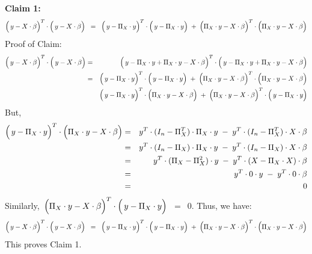 \vskip 0.5cm
\noindent
\textbf{Claim 1:}
\begin{equation*}
\left(\,y \overset{{\color{white}.}}{-} X\cdot\beta\right)^{T}\cdot\left(\,y \overset{{\color{white}.}}{-} X\cdot\beta\right)
\;\; = \;\;
	\left(\,y \overset{{\color{white}.}}{-} \Pi_{X} \cdot y\right)^{T}\cdot\left(\,y \overset{{\color{white}.}}{-} \Pi_{X} \cdot y\right)
	\;+\;
	\left(\Pi_{X} \cdot y \overset{{\color{white}.}}{-} X\cdot\beta\right)^{T}\cdot\left(\Pi_{X} \cdot y \overset{{\color{white}.}}{-} X\cdot\beta\right)
\end{equation*}
Proof of Claim:
\begin{eqnarray*}
\left(\,y \overset{{\color{white}.}}{-} X\cdot\beta\right)^{T}\cdot\left(\,y \overset{{\color{white}.}}{-} X\cdot\beta\right)
&=&
	\left(\,y \overset{{\color{white}.}}{-} \Pi_{X} \cdot y + \Pi_{X} \cdot y - X\cdot\beta\right)^{T}
	\cdot
	\left(\,y \overset{{\color{white}.}}{-} \Pi_{X} \cdot y + \Pi_{X} \cdot y - X\cdot\beta\right)
\\
&=&
	\left(\,y \overset{{\color{white}.}}{-} \Pi_{X} \cdot y\right)^{T}\cdot\left(\,y \overset{{\color{white}.}}{-} \Pi_{X} \cdot y\right)
	\;+\;
	\left(\Pi_{X} \cdot y \overset{{\color{white}.}}{-} X\cdot\beta\right)^{T}\cdot\left(\Pi_{X} \cdot y \overset{{\color{white}.}}{-} X\cdot\beta\right)
\\
&&
	\left(\,y \overset{{\color{white}.}}{-} \Pi_{X} \cdot y\right)^{T}
	\cdot
	\left(\Pi_{X} \cdot y \overset{{\color{white}.}}{-} X\cdot\beta\right)
	\;+\;
	\left(\Pi_{X} \cdot y \overset{{\color{white}.}}{-} X\cdot\beta\right)^{T}
	\cdot
	\left(\,y \overset{{\color{white}.}}{-} \Pi_{X} \cdot y\right)
\end{eqnarray*}
But,
\begin{eqnarray*}
\left(\,y \overset{{\color{white}.}}{-} \Pi_{X} \cdot y\right)^{T}
\cdot
\left(\Pi_{X} \cdot y \overset{{\color{white}.}}{-} X\cdot\beta\right)
&=&
	y^{T} \cdot (I_{n} - \Pi_{X}^{T}) \cdot \Pi_{X} \cdot y
	\;-\;
	y^{T} \cdot (I_{n} - \Pi_{X}^{T}) \cdot X\cdot\beta
\\
&=&
	y^{T} \cdot (I_{n} - \Pi_{X}) \cdot \Pi_{X} \cdot y
	\;-\;
	y^{T} \cdot (I_{n} - \Pi_{X}) \cdot X\cdot\beta
\\
&=&
	y^{T} \cdot (\Pi_{X} - \Pi_{X}^{2}) \cdot y
	\;-\;
	y^{T} \cdot (X - \Pi_{X} \cdot X) \cdot\beta
\\
&=&
	y^{T} \cdot 0 \cdot y \;-\; y^{T} \cdot 0 \cdot \beta
\\
&=&
	0
\end{eqnarray*}
Similarly,
\,$\left(\Pi_{X} \cdot y \overset{{\color{white}.}}{-} X\cdot\beta\right)^{T} \cdot \left(\,y \overset{{\color{white}.}}{-} \Pi_{X} \cdot y\right)$
\,$=$\, $0$.
Thus, we have:
\begin{equation*}
\left(\,y \overset{{\color{white}.}}{-} X\cdot\beta\right)^{T}\cdot\left(\,y \overset{{\color{white}.}}{-} X\cdot\beta\right)
\;\; = \;\;
	\left(\,y \overset{{\color{white}.}}{-} \Pi_{X} \cdot y\right)^{T}\cdot\left(\,y \overset{{\color{white}.}}{-} \Pi_{X} \cdot y\right)
	\;+\;
	\left(\Pi_{X} \cdot y \overset{{\color{white}.}}{-} X\cdot\beta\right)^{T}\cdot\left(\Pi_{X} \cdot y \overset{{\color{white}.}}{-} X\cdot\beta\right)
\end{equation*}
This proves Claim 1.

